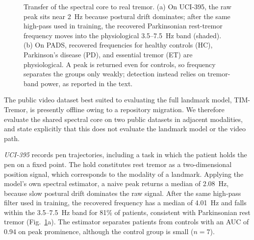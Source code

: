 \documentclass[conference]{IEEEtran}
\begin{document}
\begin{figure}[!b]
\caption{Transfer of the spectral core to real tremor. (a) On UCI-395, the raw peak
sits near 2~Hz because postural drift dominates; after the same high-pass used in
training, the recovered Parkinsonian rest-tremor frequency moves into the
physiological 3.5--7.5~Hz band (shaded). (b) On PADS, recovered frequencies for
healthy controls (HC), Parkinson's disease (PD), and essential tremor (ET) are
physiological. A peak is returned even for controls, so frequency separates the
groups only weakly; detection instead relies on tremor-band power, as reported in
the text.}
\label{fig:real}
\end{figure}
The public video dataset best suited to evaluating the full landmark model,
TIM-Tremor, is presently offline owing to a repository migration. We therefore
evaluate the shared spectral core on two public datasets in adjacent modalities,
and state explicitly that this does not evaluate the landmark model or the video
path.

\emph{UCI-395} records pen trajectories, including a task in which the patient
holds the pen on a fixed point. The hold constitutes rest tremor as a
two-dimensional position signal, which corresponds to the modality of a landmark.
Applying the model's own spectral estimator, a naive peak returns a median of
2.08~Hz, because slow postural drift dominates the raw signal. After the same
high-pass filter used in training, the recovered frequency has a median of 4.01~Hz
and falls within the 3.5--7.5~Hz band for 81\% of patients, consistent with
Parkinsonian rest tremor (Fig.~\ref{fig:real}a). The estimator separates patients
from controls with an AUC of 0.94 on peak prominence, although the control group is
small ($n=7$).
\end{document}
